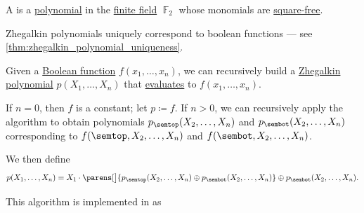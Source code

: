 \begin{definition}\label{def:zhegalkin_polynomial}
  A  is a \hyperref[def:polynomial_algebra/polynomials]{polynomial} in the \hyperref[def:finite_field]{finite field} \( \BbbF_2 \) whose monomials are \hyperref[def:square_free_element]{square-free}.
\end{definition}
\begin{comments}
  \item Zhegalkin polynomials uniquely correspond to boolean functions --- see \cref{thm:zhegalkin_polynomial_uniqueness}.
\end{comments}

\begin{algorithm}\label{alg:infer_zhegalkin_polynomial}
  Given a \hyperref[def:boolean_function]{Boolean function} \( f(x_1, \ldots, x_n) \), we can recursively build a \hyperref[def:zhegalkin_polynomial]{Zhegalkin polynomial} \( p(X_1, \ldots, X_n) \) that \hyperref[con:free_construction/evaluation]{evaluates} to \( f(x_1, \ldots, x_n) \).

  \begin{thmenum}
     If \( n = 0 \), then \( f \) is a constant; let \( p \coloneqq f \).
     If \( n > 0 \), we can recursively apply the algorithm to obtain polynomials \( p_\semtop(X_2, \ldots, X_n) \) and \( p_\sembot(X_2, \ldots, X_n) \) corresponding to \( f(\semtop, X_2, \ldots, X_n) \) and \( f(\sembot, X_2, \ldots, X_n) \).

    We then define
    \begin{equation}\label{eq:alg:infer_zhegalkin_polynomial/step}
      p(X_1, \ldots, X_n) = X_1 \cdot \parens[\big]{ p_\semtop(X_2, \ldots, X_n) \oplus p_\sembot(X_2, \ldots, X_n) } \oplus p_\sembot(X_2, \ldots, X_n).
    \end{equation}
  \end{thmenum}
\end{algorithm}
\begin{comments}
  \item This algorithm is implemented in \cite{notebook:code} as
  \begin{CodeRefDisplay}
  \end{CodeRefDisplay}
\end{comments}
